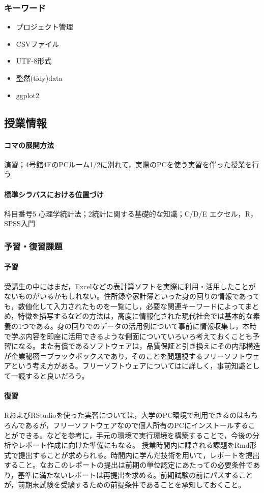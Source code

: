 \subsubsection{キーワード}
\begin{itemize}
	\item プロジェクト管理
	\item CSVファイル
	\item UTF-8形式
	\item 整然(tidy)data
	\item ggplot2
\end{itemize}
\subsection{授業情報}
\paragraph{コマの展開方法}
演習；4号館4FのPCルーム1/2に別れて，実際のPCを使う実習を伴った授業を行う
\paragraph{標準シラバスにおける位置づけ}
科目番号5 心理学統計法；2統計に関する基礎的な知識；C/D/E エクセル，R，SPSS入門
\subsubsection{予習・復習課題}
\paragraph{予習}
受講生の中にはまだ，Excelなどの表計算ソフトを実際に利用・活用したことがないものがいるかもしれない。住所録や家計簿といった身の回りの情報であっても，数値化して入力されたものを一覧にし，必要な関連キーワードによってまとめ，特徴を描写するなどの方法は，高度に情報化された現代社会では基本的な素養の1つである。身の回りでのデータの活用例について事前に情報収集し，本時で学ぶ内容を即座に活用できるような側面についていろいろ考えておくことも予習になる。また有償であるソフトウェアは，品質保証と引き換えにその内部構造が企業秘密＝ブラックボックスであり，そのことを問題視するフリーソフトウェアという考え方がある。フリーソフトウェアについては\cite{Nagao200305}に詳しく，事前知識として一読すると良いだろう。
\paragraph{復習}
RおよびRStudioを使った実習については，大学のPC環境で利用できるのはもちろんであるが，フリーソフトウェアなので個人所有のPCにインストールすることができる。\textcite{kosugi2019}などを参考に，手元の環境で実行環境を構築することで，今後の分析やレポート作成に向けた準備にもなる。
授業時間内に課される課題をRmd形式で提出することが求められる。時間内に学んだ技術を用いて，レポートを提出すること。なおこのレポートの提出は前期の単位認定にあたっての必要条件であり，基準に満たないレポートは再提出を求める。前期試験の前にパスすることが，前期末試験を受験するための前提条件であることを承知しておくこと。
